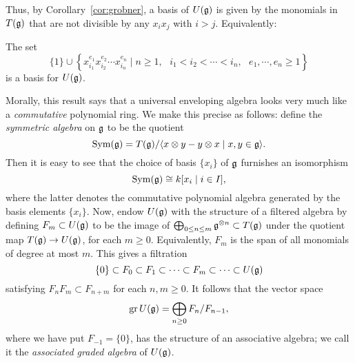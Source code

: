Thus, by Corollary~\ref{cor:grobner}, a basis of $U(\mathfrak{g})$ is given by the monomials in $T(\mathfrak{g})$ that are not divisible by any $x_ix_j$ with $i>j$. Equivalently:
\begin{thm}
The set
\begin{equation}
\label{eqn:ugbasis}
\{1\}\cup\left\{x_{i_1}^{e_1}x_{i_2}^{e_2}\cdots x_{i_n}^{e_n}\mid n\ge 1,\text{ }i_1<i_2<\cdots<i_n,\text{ }e_1,\cdots,e_n\ge 1\right\}
\end{equation}
is a basis for $U(\mathfrak{g})$.
\end{thm}
Morally, this result says that a universal enveloping algebra looks very much like a \emph{commutative} polynomial ring. We make this precise as follows: define the \emph{symmetric algebra} on $\mathfrak{g}$ to be the quotient
\begin{equation*}
\operatorname{Sym}(\mathfrak{g})=T(\mathfrak{g})/\langle x\otimes y-y\otimes x\mid x,y\in\mathfrak{g}\rangle.
\end{equation*}
Then it is easy to see that the choice of basis $\{x_i\}$ of $\mathfrak{g}$ furnishes an isomorphism
\begin{equation}
\label{eqn:symisopoly}
\operatorname{Sym}(\mathfrak{g})\cong k[x_i\mid i\in I],
\end{equation}
where the latter denotes the commutative polynomial algebra generated by the basis elements $\{x_i\}$. Now, endow $U(\mathfrak{g})$ with the structure of a filtered algebra by defining $F_m\subset U(\mathfrak{g})$ to be the image of $\bigoplus_{0\le n\le m}\mathfrak{g}^{\otimes n}\subset T(\mathfrak{g})$ under the quotient map $T(\mathfrak{g})\to U(\mathfrak{g})$, for each $m\ge 0$. Equivalently, $F_m$ is the span of all monomials of degree at most $m$. This gives a filtration
\begin{equation*}
\{0\}\subset F_0\subset F_1\subset\cdots\subset F_m\subset\cdots\subset U(\mathfrak{g})
\end{equation*}
satisfying $F_nF_m\subset F_{n+m}$ for each $n,m\ge 0$. It follows that the vector space
\begin{equation*}
\operatorname{gr} U(\mathfrak{g})=\bigoplus_{n\ge 0}F_n/F_{n-1},
\end{equation*}
where we have put $F_{-1}=\{0\}$, has the structure of an associative algebra; we call it the \emph{associated graded algebra} of $U(\mathfrak{g})$.

